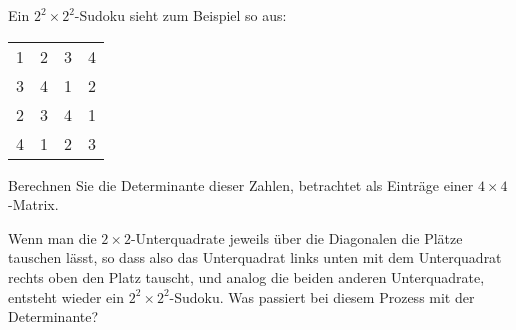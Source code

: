 Ein $2^2\times 2^2$-Sudoku sieht zum Beispiel so aus:
\begin{center}
\begin{tabular}{|cc|cc|}
\hline
1&2&3&4\\
3&4&1&2\\
\hline
2&3&4&1\\
4&1&2&3\\
\hline
\end{tabular}
\end{center}
\begin{teilaufgaben}
\item Berechnen Sie die Determinante dieser Zahlen, betrachtet
als Einträge einer $4\times 4$-Matrix.
\item Wenn man die $2\times 2$-Unterquadrate jeweils über die Diagonalen
die Plätze tauschen lässt, so dass also das Unterquadrat links unten
mit dem Unterquadrat rechts oben den Platz tauscht, und analog die beiden
anderen Unterquadrate, entsteht wieder ein $2^2\times 2^2$-Sudoku.
Was passiert bei diesem Prozess mit der  Determinante?
\end{teilaufgaben}

